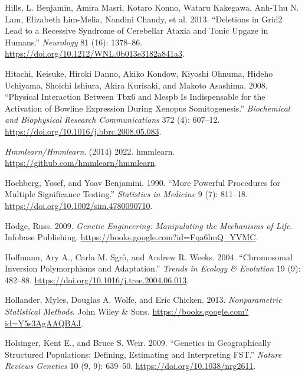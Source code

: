 \documentclass[
]{book}
\newlength{\cslhangindent}
\newlength{\cslentryspacingunit} %
\newenvironment{CSLReferences}[2] %
 {%
  \setlength{\parindent}{0pt}
  \ifodd #1
  \let\oldpar\par
  \def\par{\hangindent=\cslhangindent\oldpar}
  \fi
  \setlength{\parskip}{#2\cslentryspacingunit}
 }%
 {}
\begin{document}
\begin{CSLReferences}{1}{0}
\leavevmode{}%
Hills, L. Benjamin, Amira Masri, Kotaro Konno, Wataru Kakegawa, Anh-Thu N. Lam, Elizabeth Lim-Melia, Nandini Chandy, et al. 2013. {``Deletions in {Grid2} Lead to a Recessive Syndrome of Cerebellar Ataxia and Tonic Upgaze in Humans.''} \emph{Neurology} 81 (16): 1378--86. \url{https://doi.org/10.1212/WNL.0b013e3182a841a3}.

\leavevmode{}%
Hitachi, Keisuke, Hiroki Danno, Akiko Kondow, Kiyoshi Ohnuma, Hideho Uchiyama, Shoichi Ishiura, Akira Kurisaki, and Makoto Asashima. 2008. {``Physical Interaction Between {Tbx6} and Mespb Is Indispensable for the Activation of Bowline Expression During {Xenopus} Somitogenesis.''} \emph{Biochemical and Biophysical Research Communications} 372 (4): 607--12. \url{https://doi.org/10.1016/j.bbrc.2008.05.083}.

\leavevmode{}%
\emph{Hmmlearn/Hmmlearn}. (2014) 2022. {hmmlearn}. \url{https://github.com/hmmlearn/hmmlearn}.

\leavevmode{}%
Hochberg, Yosef, and Yoav Benjamini. 1990. {``More Powerful Procedures for Multiple Significance Testing.''} \emph{Statistics in Medicine} 9 (7): 811--18. \url{https://doi.org/10.1002/sim.4780090710}.

\leavevmode{}%
Hodge, Russ. 2009. \emph{Genetic {Engineering}: {Manipulating} the {Mechanisms} of {Life}}. {Infobase Publishing}. \url{https://books.google.com?id=Fqa6lmQ_YVMC}.

\leavevmode{}%
Hoffmann, Ary A., Carla M. Sgrò, and Andrew R. Weeks. 2004. {``Chromosomal Inversion Polymorphisms and Adaptation.''} \emph{Trends in Ecology \& Evolution} 19 (9): 482--88. \url{https://doi.org/10.1016/j.tree.2004.06.013}.

\leavevmode{}%
Hollander, Myles, Douglas A. Wolfe, and Eric Chicken. 2013. \emph{Nonparametric {Statistical Methods}}. {John Wiley \& Sons}. \url{https://books.google.com?id=Y5s3AgAAQBAJ}.

\leavevmode{}%
Holsinger, Kent E., and Bruce S. Weir. 2009. {``Genetics in Geographically Structured Populations: Defining, Estimating and Interpreting {FST}.''} \emph{Nature Reviews Genetics} 10 (9, 9): 639--50. \url{https://doi.org/10.1038/nrg2611}.


\end{CSLReferences}
\end{document}
